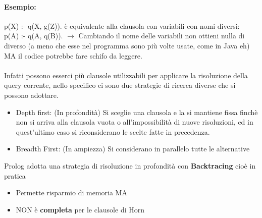 \documentclass[12pt, a4paper, openany, oneside]{book}
\begin{document}
{\paragraph{Esempio: } 
p(X) :- q(X, g(Z)).
è equivalente alla clausola con variabili con nomi diversi: \\
p(A) :- q(A, q(B)). $\to$ Cambiando il nome delle variabili non ottieni nulla
di diverso (a meno che esse nel programma sono più volte usate, come in Java eh)
MA il codice potrebbe fare schifo da leggere.
\\ \\
Infatti possono esserci più clausole utilizzabili per applicare la risoluzione
della query corrente, nello specifico ci sono due strategie di ricerca diverse
che si possono adottare.
\begin{itemize}
	\item Depth first: (In profondità) Si sceglie una clausola e la si mantiene fissa 
	finchè non si arriva alla clausola vuota o all'impossibilità di nuove risoluzioni,
	ed in quest'ultimo caso si riconsiderano le scelte fatte in precedenza.
	\item Breadth First: (In ampiezza) Si considerano in parallelo tutte le alternative
\end{itemize}
Prolog adotta una strategia di risoluzione in profondità con \textbf{Backtracing}
cioè in pratica 
\begin{itemize}
	\item Permette risparmio di memoria MA
	\item NON è \textbf{completa} per le clausole di Horn
\end{itemize}
}
\end{document}
